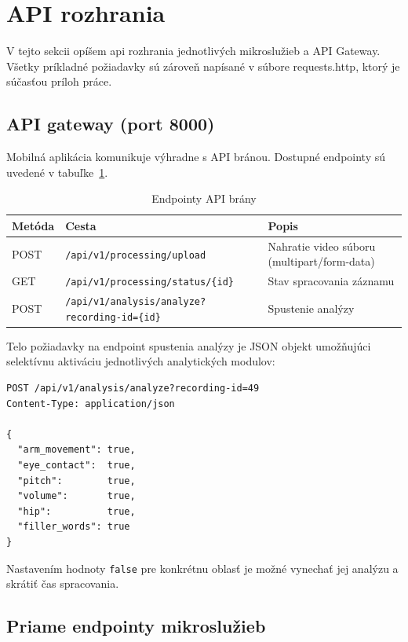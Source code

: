 \section{API rozhrania}

V tejto sekcii opíšem api rozhrania jednotlivých mikroslužieb a API Gateway.
Všetky príkladné požiadavky sú zároveň napísané v súbore requests.http, ktorý je súčasťou príloh práce.

\subsection{API gateway (port 8000)}

Mobilná aplikácia komunikuje výhradne s API bránou. Dostupné endpointy sú uvedené v tabuľke~\ref{tab:td-api-gateway}.

\begin{table}[ht]
\centering
\caption{Endpointy API brány}
\label{tab:td-api-gateway}
\begin{tabularx}{\textwidth}{|X|X|X|}
\hline
\textbf{Metóda} & \textbf{Cesta} & \textbf{Popis} \\
\hline
POST & \texttt{/api/v1/processing/upload} & Nahratie video súboru (multipart/form-data) \\
GET  & \texttt{/api/v1/processing/status/\{id\}} & Stav spracovania záznamu \\
POST & \texttt{/api/v1/analysis/analyze?recording-id=\{id\}} & Spustenie analýzy \\
\hline
\end{tabularx}
\end{table}

Telo požiadavky na endpoint spustenia analýzy je JSON objekt umožňujúci selektívnu aktiváciu jednotlivých analytických modulov:

\begin{verbatim}
POST /api/v1/analysis/analyze?recording-id=49
Content-Type: application/json

{
  "arm_movement": true,
  "eye_contact":  true,
  "pitch":        true,
  "volume":       true,
  "hip":          true,
  "filler_words": true
}
\end{verbatim}

Nastavením hodnoty \texttt{false} pre konkrétnu oblasť je možné vynechať jej analýzu a skrátiť čas spracovania.

\subsection{Priame endpointy mikroslužieb}

